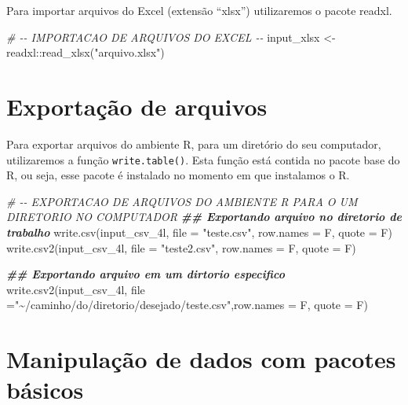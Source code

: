 \documentclass[
]{book}
\newenvironment{Shaded}{\begin{snugshade}}{\end{snugshade}}
\newcommand{\AttributeTok}[1]{\textcolor[rgb]{0.77,0.63,0.00}{#1}}
\newcommand{\CommentTok}[1]{\textcolor[rgb]{0.56,0.35,0.01}{\textit{#1}}}
\newcommand{\DocumentationTok}[1]{\textcolor[rgb]{0.56,0.35,0.01}{\textbf{\textit{#1}}}}
\newcommand{\FunctionTok}[1]{\textcolor[rgb]{0.00,0.00,0.00}{#1}}
\newcommand{\NormalTok}[1]{#1}
\newcommand{\OtherTok}[1]{\textcolor[rgb]{0.56,0.35,0.01}{#1}}
\newcommand{\SpecialCharTok}[1]{\textcolor[rgb]{0.00,0.00,0.00}{#1}}
\newcommand{\StringTok}[1]{\textcolor[rgb]{0.31,0.60,0.02}{#1}}
\begin{document}
Para importar arquivos do Excel (extensão ``xlsx'') utilizaremos o pacote readxl.

\begin{Shaded}
\begin{Highlighting}[]
\CommentTok{\# {-}{-} IMPORTACAO DE ARQUIVOS DO EXCEL {-}{-}}
\NormalTok{input\_xlsx }\OtherTok{\textless{}{-}}\NormalTok{ readxl}\SpecialCharTok{::}\FunctionTok{read\_xlsx}\NormalTok{(}\StringTok{"arquivo.xlsx"}\NormalTok{)}
\end{Highlighting}
\end{Shaded}

\hypertarget{exportauxe7uxe3o-de-arquivos}{%
\section{Exportação de arquivos}\label{exportauxe7uxe3o-de-arquivos}}

Para exportar arquivos do ambiente R, para um diretório do seu computador, utilizaremos a função \texttt{write.table()}. Esta função está contida no pacote base do R, ou seja, esse pacote é instalado no momento em que instalamos o R.

\begin{Shaded}
\begin{Highlighting}[]
\CommentTok{\#  {-}{-} EXPORTACAO DE ARQUIVOS DO AMBIENTE R PARA O UM DIRETORIO NO COMPUTADOR}
\DocumentationTok{\#\# Exportando arquivo no diretorio de trabalho}
\FunctionTok{write.csv}\NormalTok{(input\_csv\_4l, }\AttributeTok{file =} \StringTok{"teste.csv"}\NormalTok{, }\AttributeTok{row.names =}\NormalTok{ F, }\AttributeTok{quote =}\NormalTok{ F)}
\FunctionTok{write.csv2}\NormalTok{(input\_csv\_4l, }\AttributeTok{file =} \StringTok{"teste2.csv"}\NormalTok{, }\AttributeTok{row.names =}\NormalTok{ F, }\AttributeTok{quote =}\NormalTok{ F)}

\DocumentationTok{\#\# Exportando arquivo em um dirtorio especifico}
\FunctionTok{write.csv2}\NormalTok{(input\_csv\_4l, }\AttributeTok{file =}\StringTok{"\textasciitilde{}/caminho/do/diretorio/desejado/teste.csv"}\NormalTok{,}\AttributeTok{row.names =}\NormalTok{ F, }\AttributeTok{quote =}\NormalTok{ F)}
\end{Highlighting}
\end{Shaded}

\hypertarget{manipulauxe7uxe3o-de-dados-com-pacotes-buxe1sicos}{%
\section{Manipulação de dados com pacotes básicos}\label{manipulauxe7uxe3o-de-dados-com-pacotes-buxe1sicos}}
\end{document}
